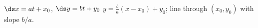 {$\ds x=at+x_0$, \quad $\ds y=bt+y_0$
}
{$y=\frac{b}{a}(x-x_0)+y_0$; line through $(x_0,y_0)$ with slope $b/a$.
}